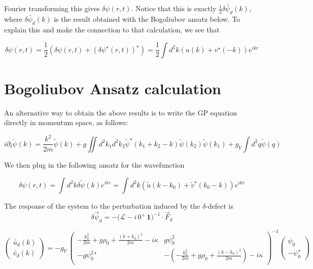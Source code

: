\documentclass[a4paper,prb,10pt,aps]{revtex4-1}
\begin{document}
Fourier transforming this gives $\delta\psi(r,t)$.
Notice that this is exactly $\frac{1}{2}\delta\widetilde{\psi_{d}}(k)$, where $\delta\widetilde{\psi_{d}}(k)$ is the result obtained with the Bogoliubov ansatz below. To explain this and make the connection to that calculation, we see that

\begin{equation}
\delta\psi(r,t) = \frac{1}{2}(\delta\psi(r,t) +(\delta\psi^{\star}(r,t))^{\star})=\frac{1}{2}\int d^2k (u(k)+v^{\star}(-k))e^{ikr}
\end{equation}

\section{Bogoliubov Ansatz calculation}
An alternative way to obtain the above results is to write the GP equation directly in momentum space, as follows:

\begin{equation}
i\partial_{t}\widetilde{\psi}(k)=\frac{k^{2}}{2m}\widetilde{\psi}(k)+g\iint d^2 k_1 d^2 k_2 \widetilde{\psi}^{\star}\left(k_{1}+k_{2}-k\right)\widetilde{\psi}\left(k_{2}\right)\widetilde{\psi}\left(k_{1}\right)+g_{V}\int d^2 q\widetilde{\psi}(q)
\end{equation}

We then plug in the following ansatz for the wavefunction

\begin{equation}
  \label{eq:9}
\delta\psi(r,t)=\int d^2 k\delta\widetilde{\psi}(k)e^{ikr}=\int d^2 k(\widetilde{u}(k-k_{0})+\widetilde{v}^{\star}(k_{0}-k))e^{ikr}
\end{equation}




The response of the system to the perturbation induced by the $\delta$-defect is 
\begin{equation}
  \label{eq:29}
\delta\vec{\psi}_{d}=-\big(\mathcal{L}-i\,0^{+}\,\mathbf{1}\big)^{-1}\cdot\vec{F}_{d}  
\end{equation}

\begin{equation}
  \label{eq:30}
\left(\begin{array}{c}
\widetilde{u_{d}}(k)\\
\widetilde{v_{d}}(k)
\end{array}\right)=-g_{V}\,\left(\begin{array}{cc}
-\frac{k_{0}^{2}}{2m}+g\rho_{0}+\frac{(k+k_{0})^{2}}{2m}-i\kappa & g\psi_{0}^{2}\\
-g\psi_{0}^{2\star} & -\left(-\frac{k_{0}^{2}}{2m}+g\rho_{0}+\frac{(k-k_{0})^{2}}{2m}\right)-i\kappa
\end{array}\right)^{-1}\left(\begin{array}{c}
\psi_{0}\\
-\psi_{0}^{\star}
\end{array}\right)  
\end{equation}
\end{document}
